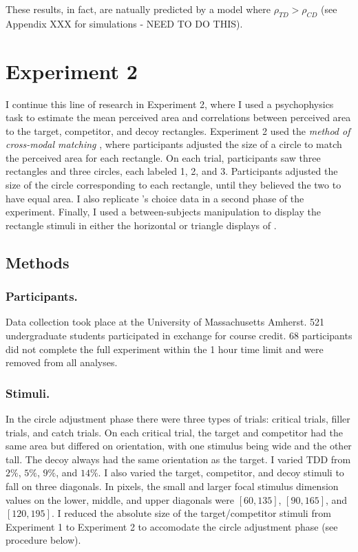 These results, in fact, are natually predicted by a model where $\rho_{TD}>\rho_{CD}$ (see Appendix XXX for simulations - NEED TO DO THIS).

\section{Experiment 2}
I continue this line of research in Experiment 2, where I used a psychophysics task to estimate the mean perceived area and correlations between perceived area to the target, competitor, and decoy rectangles. Experiment 2 used the \textit{method of cross-modal matching} \parencite{stevensCrossmodalityMatchingBrightness1965}, where participants adjusted the size of a circle to match the perceived area for each rectangle. On each trial, participants saw three rectangles and three circles, each labeled 1, 2, and 3. Participants adjusted the size of the circle corresponding to each rectangle, until they believed the two to have equal area. I also replicate \textcite{spektorWhenGoodLooks2018b}'s choice data in a second phase of the experiment. Finally, I used a between-subjects manipulation to display the rectangle stimuli in either the horizontal or triangle displays of \textcite{spektorWhenGoodLooks2018b}.

\subsection{Methods}
\subsubsection{Participants.}
Data collection took place at the University of Massachusetts Amherst. 521 undergraduate students participated in exchange for course credit. 68 participants did not complete the full experiment within the 1 hour time limit and were removed from all analyses. 

\subsubsection{Stimuli.}
In the circle adjustment phase there were three types of trials: critical trials, filler trials, and catch trials. On each critical trial, the target and competitor had the same area but differed on orientation, with one stimulus being wide and the other tall. The decoy always had the same orientation as the target. I varied TDD from $2\%$, $5\%$, $9\%$, and $14\%$. I also varied the target, competitor, and decoy stimuli to fall on three diagonals. In pixels, the small and larger focal stimulus dimension values on the lower, middle, and upper diagonals were $[60, 135]$, $[90, 165]$, and $[120,195]$. I reduced the absolute size of the target/competitor stimuli from Experiment 1 to Experiment 2 to accomodate the circle adjustment phase (see procedure  below).

